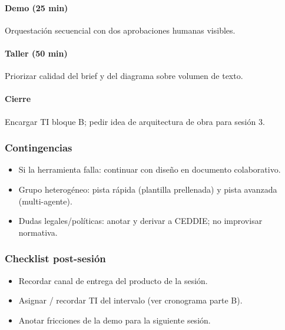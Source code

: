 \paragraph{Demo (25 min)} Orquestación secuencial con dos aprobaciones humanas visibles.
\paragraph{Taller (50 min)} Priorizar calidad del brief y del diagrama sobre volumen de texto.
\paragraph{Cierre} Encargar TI bloque B; pedir idea de arquitectura de obra para sesión 3.

\subsubsection*{Contingencias}
\begin{itemize}
\item Si la herramienta falla: continuar con diseño en documento colaborativo.
\item Grupo heterogéneo: pista rápida (plantilla prellenada) y pista avanzada (multi-agente).
\item Dudas legales/políticas: anotar y derivar a CEDDIE; no improvisar normativa.
\end{itemize}

\subsubsection*{Checklist post-sesión}
\begin{itemize}
\item[$\square$] Recordar canal de entrega del producto de la sesión.
\item[$\square$] Asignar / recordar TI del intervalo (ver cronograma parte B).
\item[$\square$] Anotar fricciones de la demo para la siguiente sesión.
\end{itemize}

